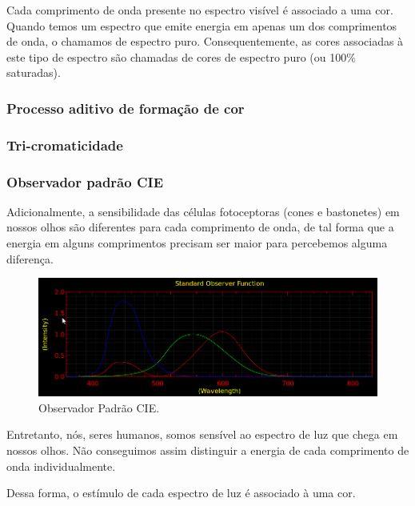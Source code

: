 \documentclass[a4paper,10pt]{report}
\begin{document}
\par
Cada comprimento de onda presente no espectro visível é associado a uma cor.
Quando temos um espectro que emite energia em apenas um dos comprimentos de
onda, o chamamos de espectro puro. Consequentemente, as cores associadas à
este tipo de espectro são chamadas de cores de espectro puro (ou 100\%
saturadas).

\subsubsection{Processo aditivo de formação de cor}

\subsubsection{Tri-cromaticidade}

\subsubsection{Observador padrão CIE}
\par
Adicionalmente, a sensibilidade das células fotoceptoras (cones e
bastonetes) em nossos olhos são diferentes para cada comprimento de onda, de
tal forma que a energia em alguns comprimentos precisam ser maior para
percebemos alguma diferença.

\begin{figure}[!htb]
     \centering
     \includegraphics[scale=0.8]{img/cie_std_observer.png}
     \caption{Observador Padrão CIE.}
     \label{Label de referência para a imagem}
\end{figure}

\par
Entretanto, nós, seres humanos, somos sensível ao espectro de luz que
chega em nossos olhos. Não conseguimos assim distinguir a energia de cada
comprimento de onda individualmente.

Dessa forma, o estímulo de cada espectro de luz é
associado à uma cor.
\end{document}
